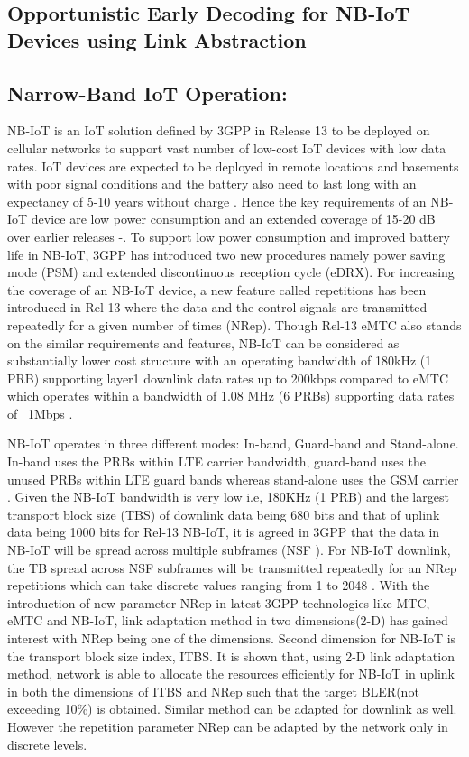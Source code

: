 \begin{multicols}{2}
\section{Opportunistic Early Decoding for NB-IoT Devices using Link Abstraction}

\subsection{Narrow-Band IoT Operation:}

NB-IoT is an IoT solution defined by 3GPP in Release 13 to be deployed on cellular networks to support vast number of low-cost IoT devices with low data rates. IoT devices are expected to be deployed in remote locations and basements with poor signal conditions and the battery also need to last long with an expectancy of 5-10 years without charge \cite{art1-key24}. Hence the key requirements of an NB-IoT device are low power consumption and an extended coverage of 15-20 dB over earlier releases \cite{art1-key25}-\cite{art1-key26}. To support low power consumption and improved battery life in NB-IoT, 3GPP has introduced two new procedures namely power saving mode (PSM) and extended discontinuous reception cycle (eDRX). For increasing the coverage of an NB-IoT device, a new feature called repetitions has been introduced in Rel-13 where the data and the control signals are transmitted repeatedly for a given number of times (NRep). Though Rel-13 eMTC also stands on the similar requirements and features, NB-IoT can be considered as substantially lower cost structure with an operating bandwidth of 180kHz (1 PRB) supporting layer1 downlink data rates up to 200kbps \cite{art1-key27} compared to eMTC which operates within a bandwidth of 1.08 MHz (6 PRBs) supporting data rates of ~1Mbps \cite{art1-key27}.

NB-IoT operates in three different modes: In-band, Guard-band and Stand-alone. In-band uses the PRBs within LTE carrier bandwidth, guard-band uses the unused PRBs within LTE guard bands whereas stand-alone uses the GSM carrier \cite{art1-key25}. Given the NB-IoT bandwidth is very low i.e, 180KHz (1 PRB) and the largest transport block size (TBS) of downlink data being 680 bits and that of uplink data being 1000 bits \cite{art1-key06} for Rel-13 NB-IoT, it is agreed in 3GPP that the data in NB-IoT will be spread across multiple subframes (NSF ). For NB-IoT downlink, the TB spread across NSF subframes will be transmitted repeatedly for an NRep repetitions which can take discrete values ranging from 1 to 2048 \cite{art1-key27}. With the introduction of new parameter NRep in latest 3GPP technologies like MTC, eMTC and NB-IoT, link adaptation method in two dimensions(2-D) has gained interest with NRep being one of the dimensions. Second dimension for NB-IoT is the transport block size index, ITBS. It is shown that, using 2-D link adaptation method, network is able to allocate the resources efficiently for NB-IoT in uplink in both the dimensions of ITBS and NRep such that the target BLER(not exceeding 10\%) is obtained. Similar method can be adapted for downlink as well. However the repetition parameter NRep can be adapted by the network only in discrete levels. 


\end{multicols}
